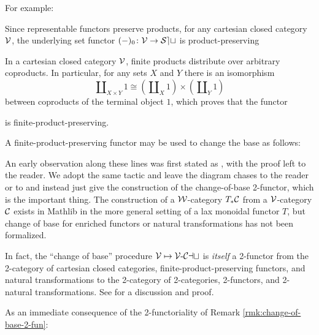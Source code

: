 For example:


\begin{ex}\label{ex:lax-u-set} Since representable functors preserve products, for any cartesian closed category ${\mathord{\mathcal{V}}}$, the underlying set functor $(-)_0 \colon {\mathord{\mathcal{V}}} \to {\mathord{\mathcal{Set}}}$ is product-preserving
\end{ex}

\begin{ex}\label{ex:strong-free} In a cartesian closed category ${\mathord{\mathcal{V}}}$, finite products distribute over arbitrary coproducts. In particular, for any sets $X$ and $Y$ there is an isomorphism
\[ \amalg_{X \times Y} 1 \cong (\amalg_X 1) \times (\amalg_Y 1)\] between coproducts of the terminal object $1$, which proves that the functor
\begin{center}
\end{center} is finite-product-preserving.
\end{ex}

A finite-product-preserving functor may be used to change the base as follows:


An early observation along these lines was first stated as \cite[II.6.3]{EilenbergKelly:1966cc}, with the proof left to the reader. We adopt the same tactic and leave the diagram chases to the reader or to \cite[4.2.4]{Cruttwell:2008rr} and instead just give the construction of the change-of-base 2-functor, which is the important thing. The construction of a ${\mathord{\mathcal{W}}}$-category $T_*{\mathord{\mathcal{C}}}$ from a ${\mathord{\mathcal{V}}}$-category ${\mathord{\mathcal{C}}}$ exists in Mathlib in the more general setting of a lax monoidal functor $T$, but change of base for enriched functors or natural transformations has not been formalized.




\begin{rmk}\label{rmk:change-of-base-2-fun} In fact, the ``change of base'' procedure ${\mathord{\mathcal{V}}} \mapsto {{\mathord{\mathcal{V}}}}\text{-}{\mathord{\mathcal{Cat}}}$ is \emph{itself} a 2-functor from the 2-category of cartesian closed categories, finite-product-preserving functors, and natural transformations to the 2-category of 2-cat\-e\-go\-ries, 2-functors, and 2-natural transformations. See \cite[\S 4.3]{Cruttwell:2008rr} for a discussion and proof.
\end{rmk}


As an immediate consequence of the 2-functoriality of Remark \ref{rmk:change-of-base-2-fun}:


